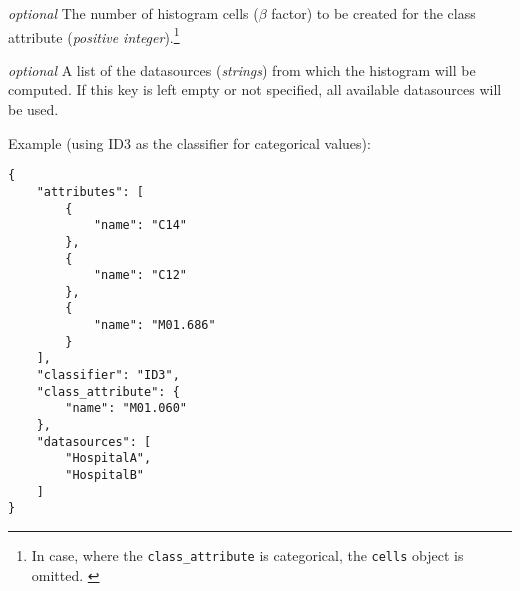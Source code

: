 \begin{description}[labelwidth=5em, leftmargin=\dimexpr\labelwidth+\labelsep\relax]
\begin{description}[labelwidth=9em, leftmargin=\dimexpr\labelwidth+\labelsep\relax]
\begin{description}[labelwidth=3em, leftmargin=\dimexpr\labelwidth+\labelsep\relax]
        \item[\texttt{cells}:] {\color{blue}\textit{optional}} The number of histogram cells ($\beta$ factor) to be created for the class attribute (\textit{positive integer}).\footnote{In case, where the \texttt{class\_attribute} is categorical, the \texttt{cells} object is omitted. \label{refnote2}}
    \end{description}

    \item[\texttt{datasources}:] {\color{blue}\textit{optional}} A list of the datasources (\textit{strings}) from which the histogram will be computed.
    If this key is left empty or not specified, all available datasources will be used.

\end{description}

\begin{minipage}{\linewidth}
  Example (using ID3 as the classifier for categorical values):\\
{
\begin{verbatim}
{
    "attributes": [
        {
            "name": "C14"
        },
        {
            "name": "C12"
        },
        {
            "name": "M01.686"
        }
    ],
    "classifier": "ID3",
    "class_attribute": {
        "name": "M01.060"
    },
    "datasources": [
        "HospitalA",
        "HospitalB"
    ]
}
\end{verbatim}
\label{sc:decisionTree-post-categorical-id3}
}
\end{minipage}


\end{description}

